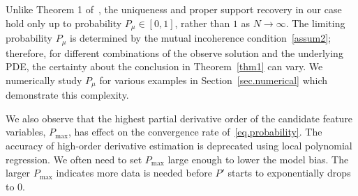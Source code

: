 \documentclass[a4paper,11pt]{article}
\begin{document}
Unlike Theorem 1 of~\cite{wainwright2009sharp}, the uniqueness and proper support recovery in our case hold only up to probability $P_\mu\in [0,1]$, rather than $1$ as $N\to\infty$. The limiting probability $P_\mu$ is determined by the mutual incoherence condition~\eqref{assum2}; therefore, for different combinations of the observe solution and the underlying PDE, the certainty about the conclusion in Theorem~\ref{thm1} can vary. We numerically study $P_\mu$ for various examples in Section~\ref{sec.numerical} which demonstrate this complexity.

We also observe that the highest partial derivative order of the candidate feature variables, $P_{\max}$, has effect on the convergence rate of~\eqref{eq.probability}. The accuracy of high-order derivative estimation is deprecated using local polynomial regression. We  often need to set $P_{\max}$ large enough to lower the model bias.  The larger $P_{\max}$ indicates more data is needed before $P'$ starts to exponentially drops to $0$. 
\end{document}
